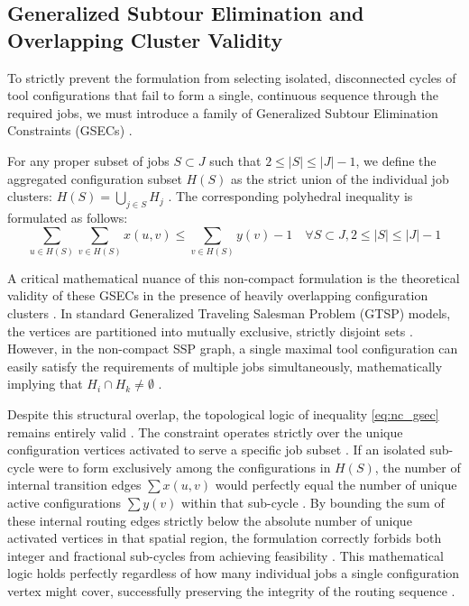 \documentclass[11pt, a4paper]{book}
\begin{document}
	\subsection{Generalized Subtour Elimination and Overlapping Cluster Validity}
	
	To strictly prevent the formulation from selecting isolated, disconnected cycles of tool configurations that fail to form a single, continuous sequence through the required jobs, we must introduce a family of Generalized Subtour Elimination Constraints (GSECs) \cite{Colares2026}. %
	
	For any proper subset of jobs $S \subset J$ such that $2 \le |S| \le |J|-1$, we define the aggregated configuration subset $H(S)$ as the strict union of the individual job clusters: $H(S) = \bigcup_{j \in S} H_j$ \cite{Colares2026}. %
	The corresponding polyhedral inequality is formulated as follows:
	\begin{equation}
		\sum_{u \in H(S)} \sum_{v \in H(S)} x(u, v) \le \sum_{v \in H(S)} y(v) - 1 \quad \forall S \subset J, 2 \le |S| \le |J|-1 \label{eq:nc_gsec} %
	\end{equation}
	
	A critical mathematical nuance of this non-compact formulation is the theoretical validity of these GSECs in the presence of heavily overlapping configuration clusters \cite{Colares2026}. %
	In standard Generalized Traveling Salesman Problem (GTSP) models, the vertices are partitioned into mutually exclusive, strictly disjoint sets \cite{Pop2024}. %
	However, in the non-compact SSP graph, a single maximal tool configuration can easily satisfy the requirements of multiple jobs simultaneously, mathematically implying that $H_i \cap H_k \neq \emptyset$ \cite{Colares2026}. %
	
	Despite this structural overlap, the topological logic of inequality \eqref{eq:nc_gsec} remains entirely valid \cite{Colares2026}. %
	The constraint operates strictly over the unique configuration vertices activated to serve a specific job subset \cite{Colares2026}. %
	If an isolated sub-cycle were to form exclusively among the configurations in $H(S)$, the number of internal transition edges $\sum x(u, v)$ would perfectly equal the number of unique active configurations $\sum y(v)$ within that sub-cycle \cite{Colares2026}. %
	By bounding the sum of these internal routing edges strictly below the absolute number of unique activated vertices in that spatial region, the formulation correctly forbids both integer and fractional sub-cycles from achieving feasibility \cite{Colares2026}. %
	This mathematical logic holds perfectly regardless of how many individual jobs a single configuration vertex might cover, successfully preserving the integrity of the routing sequence \cite{Colares2026}. %
	
\end{document}
